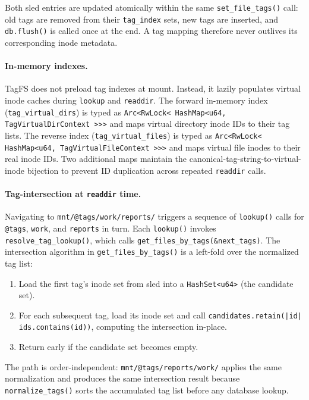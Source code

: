 \documentclass[journal]{IEEEtran}
\begin{document}
Both sled entries are updated atomically within the same
\texttt{set\_file\_tags()} call: old tags are removed from their
\texttt{tag\_index} sets, new tags are inserted, and \texttt{db.flush()}
is called once at the end.  A tag mapping therefore never outlives its
corresponding inode metadata.

\paragraph{In-memory indexes.}
TagFS does not preload tag indexes at mount.  Instead, it lazily
populates virtual inode caches during \texttt{lookup} and
\texttt{readdir}. The forward in-memory index (\texttt{tag\_virtual\_dirs})
is typed as \texttt{Arc\textless{}\allowbreak{}RwLock\textless{}\allowbreak{}%
HashMap\textless{}u64,\,\allowbreak{}TagVirtualDirContext%
\textgreater{}\textgreater{}\textgreater{}}
and maps virtual directory inode IDs to their tag lists.  The reverse
index (\texttt{tag\_virtual\_files}) is typed as
\texttt{Arc\textless{}\allowbreak{}RwLock\textless{}\allowbreak{}%
HashMap\textless{}u64,\,\allowbreak{}TagVirtualFileContext%
\textgreater{}\textgreater{}\textgreater{}}
and maps virtual file inodes to their real inode IDs.
Two additional maps maintain the canonical-tag-string-to-virtual-inode
bijection to prevent ID duplication across repeated \texttt{readdir} calls.

\paragraph{Tag-intersection at \texttt{readdir} time.}
Navigating to \texttt{mnt/@tags/work/reports/} triggers a sequence of
\texttt{lookup()} calls for \texttt{@tags}, \texttt{work}, and
\texttt{reports} in turn.  Each \texttt{lookup()} invokes
\texttt{resolve\_tag\_lookup()}, which calls
\texttt{get\_files\_by\_tags(\&next\_tags)}.  The intersection algorithm
in \texttt{get\_files\_by\_tags()} is a left-fold over the normalized
tag list:
\begin{enumerate}
\item Load the first tag's inode set from sled into a
  \texttt{HashSet\textless{}u64\textgreater{}} (the candidate set).
\item For each subsequent tag, load its inode set and call
  \texttt{candidates.retain(|id| ids.contains(id))}, computing the
  intersection in-place.
\item Return early if the candidate set becomes empty.
\end{enumerate}
The path is order-independent: \texttt{mnt/@tags/reports/work/}
applies the same normalization and produces the same intersection result
because \texttt{normalize\_tags()} sorts the accumulated tag list before
any database lookup.
\end{document}

